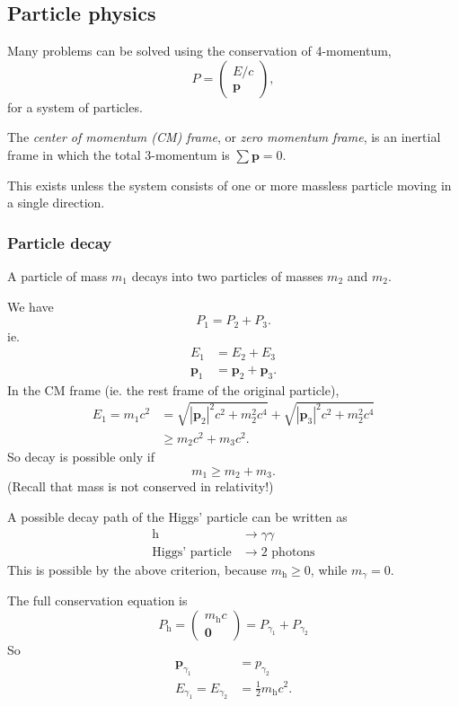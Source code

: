 \documentclass[a4paper]{article}
\begin{document}
\subsection{Particle physics}
Many problems can be solved using the conservation of 4-momentum,
\[
  P = 
  \begin{pmatrix}
    E/c\\
    \mathbf{p}
  \end{pmatrix},
\]
for a system of particles.
\begin{defi}
  The \emph{center of momentum (CM) frame}, or \emph{zero momentum frame}, is an inertial frame in which the total 3-momentum is $\sum \mathbf{p} = 0$.
\end{defi}
This exists unless the system consists of one or more massless particle moving in a single direction.

\subsubsection*{Particle decay}
A particle of mass $m_1$ decays into two particles of masses $m_2$ and $m_2$.

We have
\[
  P_1 = P_2 + P_3.
\]
ie.
\begin{align*}
  E_1 &= E_2 + E_3\\
  \mathbf{p}_1 &= \mathbf{p}_2 + \mathbf{p}_3.
\end{align*}
In the CM frame (ie. the rest frame of the original particle),
\begin{align*}
  E_1 = m_1 c^2 &= \sqrt{|\mathbf{p}_2|^2 c^2 + m_2^2c^4} + \sqrt{|\mathbf{p}_3|^2 c^2 + m_2^2 c^4}\\
  &\geq m_2c^2 + m_3 c^2.
\end{align*}
So decay is possible only if
\[
  m_1 \geq m_2 + m_3.
\]
(Recall that mass is not conserved in relativity!)

\begin{eg}
  A possible decay path of the Higgs' particle can be written as
  \begin{align*}
    \mathrm{h} &\to \gamma \gamma\\
    \text{Higgs'\ particle} &\to 2\text{ photons}
  \end{align*}
  This is possible by the above criterion, because $m_\mathrm{h} \geq 0$, while $m_\gamma = 0$.

  The full conservation equation is
  \[
    P_\mathrm{h} = 
    \begin{pmatrix}
      m_\mathrm{h}c\\
      \mathbf{0}
    \end{pmatrix} = 
    P_{\gamma_1} + P_{\gamma_2}
  \]
  So
  \begin{align*}
    \mathbf{p}_{\gamma_1} &= p_{\gamma_2}\\
    E_{\gamma_1} = E_{\gamma_2} &= \frac{1}{2}m_\mathrm{h} c^2.
  \end{align*}
\end{eg}
\end{document}
